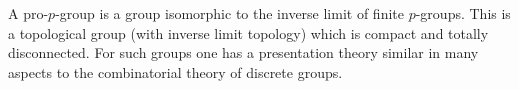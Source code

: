 \documentclass[11pt,a4paper]{article}
\newtheorem{proposition}[theorem]{Proposition}
\begin{document}

A pro-$ p $-group is a group isomorphic to the inverse limit of finite $ p $-groups. This is a topological group (with inverse limit topology) which is compact and totally disconnected.
For such groups one has a presentation theory similar in many aspects to the combinatorial theory of discrete groups.
\end{document}
